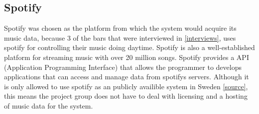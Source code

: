 \subsection{Spotify}
\label{sub:spotify}
Spotify was chosen as the platform from which the system would acquire its music data, because 3 of the bars that were interviewed in \cref{interviews}, uses spotify for controlling their music doing daytime. Spotify is also a well-established platform for streaming music with over 20 million songs. 
 Spotify provides a API (Application Programming Interface) that allows the programmer to develops applications that can access and manage data from spotifys servers.
Although it is only allowed to use spotify as an publicly availible system in Sweden \cref{source}, this means the project group does not have to deal with licensing and a hosting of music data for the system.
